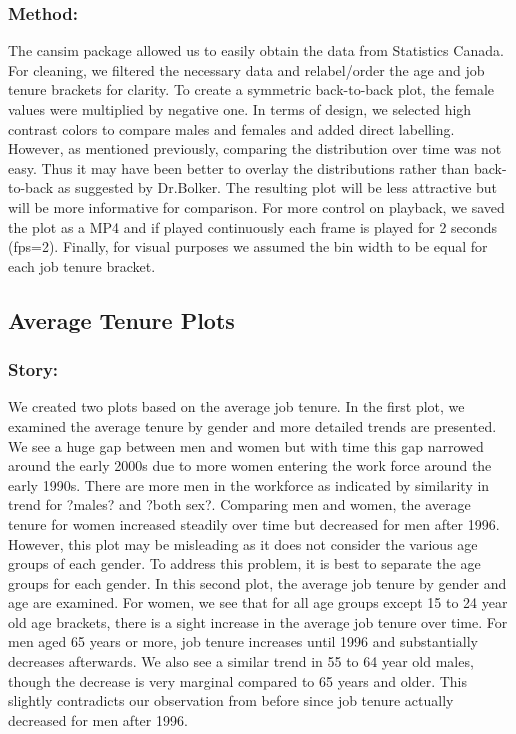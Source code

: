 \documentclass[]{article}
\begin{document}
\hypertarget{method}{%
\subsubsection{Method:}\label{method}}

The cansim package allowed us to easily obtain the data from Statistics
Canada. For cleaning, we filtered the necessary data and relabel/order
the age and job tenure brackets for clarity. To create a symmetric
back-to-back plot, the female values were multiplied by negative one. In
terms of design, we selected high contrast colors to compare males and
females and added direct labelling. However, as mentioned previously,
comparing the distribution over time was not easy. Thus it may have been
better to overlay the distributions rather than back-to-back as
suggested by Dr.Bolker. The resulting plot will be less attractive but
will be more informative for comparison. For more control on playback,
we saved the plot as a MP4 and if played continuously each frame is
played for 2 seconds (fps=2). Finally, for visual purposes we assumed
the bin width to be equal for each job tenure bracket.

\hypertarget{average-tenure-plots}{%
\subsection{Average Tenure Plots}\label{average-tenure-plots}}

\hypertarget{story-1}{%
\subsubsection{Story:}\label{story-1}}

We created two plots based on the average job tenure. In the first plot,
we examined the average tenure by gender and more detailed trends are
presented. We see a huge gap between men and women but with time this
gap narrowed around the early 2000s due to more women entering the work
force around the early 1990s. There are more men in the workforce as
indicated by similarity in trend for ?males? and ?both sex?. Comparing
men and women, the average tenure for women increased steadily over time
but decreased for men after 1996. However, this plot may be misleading
as it does not consider the various age groups of each gender. To
address this problem, it is best to separate the age groups for each
gender. In this second plot, the average job tenure by gender and age
are examined. For women, we see that for all age groups except 15 to 24
year old age brackets, there is a sight increase in the average job
tenure over time. For men aged 65 years or more, job tenure increases
until 1996 and substantially decreases afterwards. We also see a similar
trend in 55 to 64 year old males, though the decrease is very marginal
compared to 65 years and older. This slightly contradicts our
observation from before since job tenure actually decreased for men
after 1996.
\end{document}
